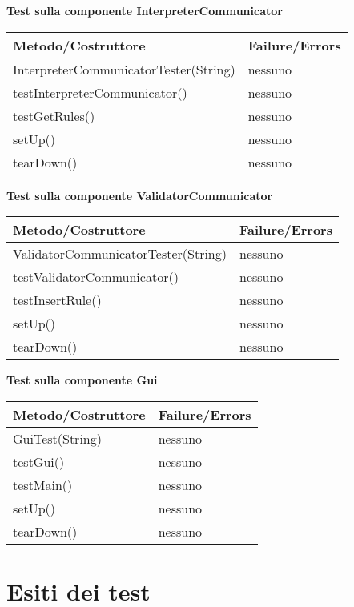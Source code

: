 \begin{center}
\textbf{Test sulla componente InterpreterCommunicator}\\
\begin{tabular}{|p{}|p{3 cm}|} \hline
\textbf{Metodo/Costruttore} & \textbf{Failure/Errors} \\ \hline
InterpreterCommunicatorTester(String) & nessuno \\ \hline
testInterpreterCommunicator() & nessuno \\ \hline
testGetRules() & nessuno \\ \hline
setUp() & nessuno \\ \hline
tearDown() & nessuno \\ \hline
\end{tabular}

\textbf{Test sulla componente ValidatorCommunicator}\\
\begin{tabular}{|p{}|p{3 cm}|} \hline
\textbf{Metodo/Costruttore} & \textbf{Failure/Errors} \\ \hline
ValidatorCommunicatorTester(String) & nessuno \\ \hline
testValidatorCommunicator() & nessuno \\ \hline
testInsertRule() & nessuno \\ \hline
setUp() & nessuno \\ \hline
tearDown() & nessuno \\ \hline
\end{tabular}

\textbf{Test sulla componente Gui}\\
\begin{tabular}{|p{}|p{3 cm}|} \hline
\textbf{Metodo/Costruttore} & \textbf{Failure/Errors} \\ \hline
GuiTest(String) & nessuno \\ \hline
testGui() & nessuno \\ \hline
testMain() & nessuno \\ \hline
setUp() & nessuno \\ \hline
tearDown() & nessuno \\ \hline
\end{tabular}
\end{center}

\chapter{Esiti dei test}
